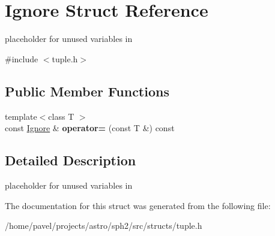 \hypertarget{structIgnore}{}\section{Ignore Struct Reference}
\label{structIgnore}


placeholder for unused variables in  




{\ttfamily \#include $<$tuple.\+h$>$}

\subsection*{Public Member Functions}
\begin{DoxyCompactItemize}
\item 
\hypertarget{structIgnore_a2c0d0d3c5a5ac93b1839103b1b0dafba}{}\label{structIgnore_a2c0d0d3c5a5ac93b1839103b1b0dafba} 
{\footnotesize template$<$class T $>$ }\\const \hyperlink{structIgnore}{Ignore} \& {\bfseries operator=} (const T \&) const
\end{DoxyCompactItemize}


\subsection{Detailed Description}
placeholder for unused variables in 

The documentation for this struct was generated from the following file\+:\begin{DoxyCompactItemize}
\item 
/home/pavel/projects/astro/sph2/src/structs/tuple.\+h\end{DoxyCompactItemize}

